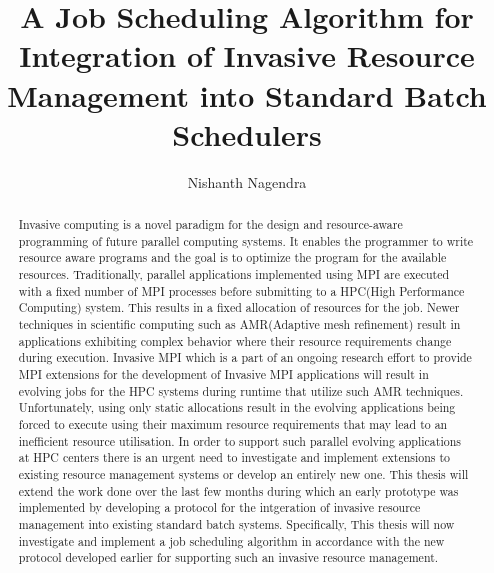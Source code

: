 \documentclass{article}
\begin{document}
\title{A Job Scheduling Algorithm for Integration of Invasive Resource Management into Standard Batch Schedulers}
\author{Nishanth Nagendra}

\maketitle

\begin{abstract}
Invasive computing is a novel paradigm for the design and resource-aware programming of future parallel computing systems. It enables the programmer to write resource aware programs and the goal is to optimize the program for the available resources. Traditionally, parallel applications implemented using MPI are executed with a fixed number of MPI processes before submitting to a HPC(High Performance Computing) system. This results in a fixed allocation of resources for the job. Newer techniques in scientific computing such as AMR(Adaptive mesh refinement) result in applications exhibiting complex behavior where their resource requirements change during execution. Invasive MPI which is a part of an ongoing research effort to provide MPI extensions for the development of Invasive MPI applications will result in evolving jobs for the HPC systems during runtime that utilize such AMR techniques. Unfortunately, using only static allocations result in the evolving applications being forced to execute using their maximum resource requirements that may lead to an inefficient resource utilisation. In order to support such parallel evolving applications at HPC centers there is an urgent need to investigate and implement extensions to existing resource management systems or develop an entirely new one. This thesis will extend the work done over the last few months during which an early prototype was implemented by developing a protocol for the intgeration of invasive resource management into existing standard batch systems. Specifically, This thesis will now investigate and implement a job scheduling algorithm in accordance with the new protocol developed earlier for supporting such an invasive resource management.\par
\end{abstract}
\end{document}
